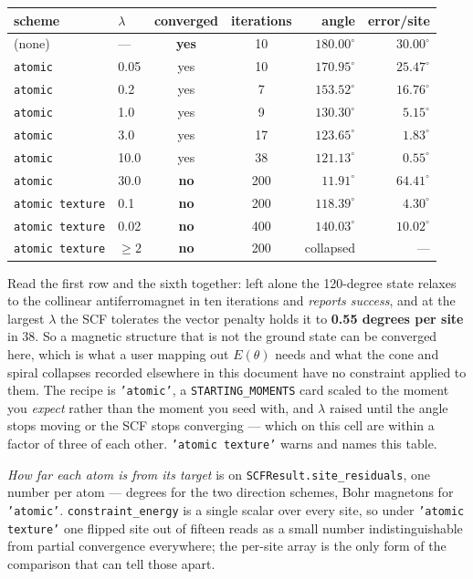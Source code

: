 \documentclass[11pt,a4paper]{article}
\newcommand{\code}[1]{\texttt{\small #1}}
\begin{document}
\begin{center}
\begin{tabular}{llccrr}
\toprule
scheme & $\lambda$ & converged & iterations & angle & error/site \\
\midrule
(none)           & ---   & \textbf{yes} &  10 & $180.00^\circ$ & $30.00^\circ$ \\
\code{atomic}    & 0.05  & yes &  10 & $170.95^\circ$ & $25.47^\circ$ \\
\code{atomic}    & 0.2   & yes &   7 & $153.52^\circ$ & $16.76^\circ$ \\
\code{atomic}    & 1.0   & yes &   9 & $130.30^\circ$ & $5.15^\circ$ \\
\code{atomic}    & 3.0   & yes &  17 & $123.65^\circ$ & $1.83^\circ$ \\
\code{atomic}    & 10.0  & yes &  38 & $\mathbf{121.13^\circ}$ & $\mathbf{0.55^\circ}$ \\
\code{atomic}    & 30.0  & \textbf{no} & 200 & $11.91^\circ$ & $64.41^\circ$ \\
\code{atomic texture} & 0.1  & \textbf{no} & 200 & $118.39^\circ$ & $4.30^\circ$ \\
\code{atomic texture} & 0.02 & \textbf{no} & 400 & $140.03^\circ$ & $10.02^\circ$ \\
\code{atomic texture} & $\geq 2$ & \textbf{no} & 200 & collapsed & --- \\
\bottomrule
\end{tabular}
\end{center}

Read the first row and the sixth together: left alone the 120-degree state
relaxes to the collinear antiferromagnet in ten iterations and \emph{reports
success}, and at the largest $\lambda$ the SCF tolerates the vector penalty
holds it to \textbf{0.55 degrees per site} in 38. So a magnetic structure that
is not the ground state can be converged here, which is what a user mapping out
$E(\theta)$ needs and what the cone and spiral collapses recorded elsewhere in
this document have no constraint applied to them. The recipe is
\code{'atomic'}, a \code{STARTING\_MOMENTS} card scaled to the moment you
\emph{expect} rather than the moment you seed with, and $\lambda$ raised until
the angle stops moving or the SCF stops converging --- which on this cell are
within a factor of three of each other. \code{'atomic texture'} warns and names
this table.

\emph{How far each atom is from its target} is on
\code{SCFResult.site\_residuals}, one number per atom --- degrees for the two
direction schemes, Bohr magnetons for \code{'atomic'}. \code{constraint\_energy}
is a single scalar over every site, so under \code{'atomic texture'} one flipped
site out of fifteen reads as a small number indistinguishable from partial
convergence everywhere; the per-site array is the only form of the comparison
that can tell those apart.
\end{document}
